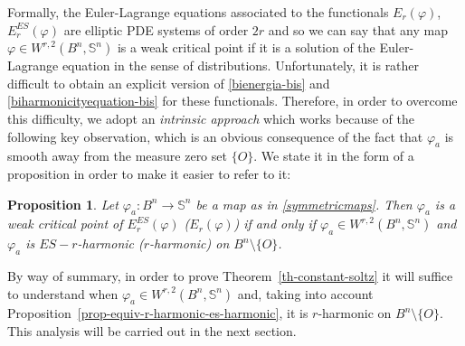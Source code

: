 \documentclass[11pt]{amsart}
\theoremstyle{plain}
\newtheorem{proposition}  [theorem]  {Proposition}
\theoremstyle{definition}
\numberwithin{equation}{section}
\def \s{{\mathbb S}}
\def \link {~}
\numberwithin{equation}{section}
\begin{document}
Formally, the Euler-Lagrange equations associated to the functionals $E_r(\varphi)$, $E_r^{ES}(\varphi)$ are elliptic PDE systems of order $2r$ and so we can say that any map $\varphi \in W^{r,2}\left ( B^n,\s^n \right )$ is a weak critical point if it is a solution of the Euler-Lagrange equation in the sense of distributions. Unfortunately, it is rather difficult to obtain an explicit version of \eqref{bienergia-bis} and \eqref{biharmonicityequation-bis} for these functionals. Therefore, in order to overcome this difficulty, we adopt an \textit{intrinsic approach} which works because of the following key observation, which is an obvious consequence of the fact that $\varphi_a$ is smooth away from the measure zero set $\{O\}$. We state it in the form of a proposition in order to make it easier to refer to it:
\begin{proposition}\label{pro:weakly-criterium} Let
$\varphi_a:B^n \to \s^n$ be a map as in \eqref{symmetricmaps}. Then $\varphi_a$ is a weak critical point of $E^{ES}_r(\varphi)$ ($E_r(\varphi)$) if and only if  $\varphi_a \in W^{r,2}\left ( B^n,\s^n \right )$ and $\varphi_a$ is $ES-r$-harmonic ($r$-harmonic) on $B^n \setminus \{ O\}$.
\end{proposition}
By way of summary, in order to prove Theorem\link\ref{th-constant-soltz} it will suffice to understand when $\varphi_a \in W^{r,2}\left ( B^n,\s^n \right )$ and, taking into account Proposition~\ref{prop-equiv-r-harmonic-es-harmonic}, it is $r$-harmonic on $B^n \setminus \{ O\}$. This analysis will be carried out in the next section.
\end{document}
